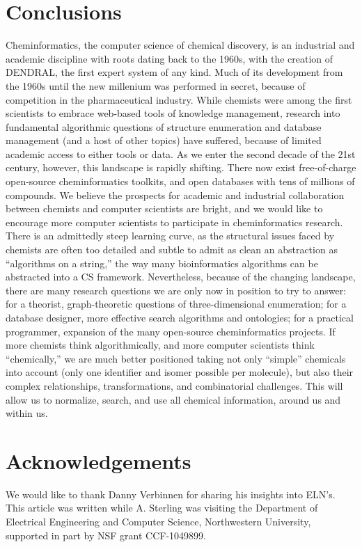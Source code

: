 \documentclass{sig-alternate}
\begin{document}
\section{Conclusions}
\label{sec:conclusions}
Cheminformatics, the computer science of chemical discovery, is an
industrial and academic discipline with roots dating back to the
1960s, with the creation of DENDRAL, the first expert system of any
kind.  Much of its development from the 1960s until the new millenium
was performed in secret, because of competition in the pharmaceutical
industry.  While chemists were among the first scientists to embrace
web-based tools of knowledge management, research into fundamental
algorithmic questions of structure enumeration and database management
(and a host of other topics) have suffered, because of limited
academic access to either tools or data.  As we enter the second
decade of the 21st century, however, this landscape is rapidly
shifting.  There now exist free-of-charge open-source cheminformatics
toolkits, and open databases with tens of millions of compounds.  We
believe the prospects for academic and industrial collaboration
between chemists and computer scientists are bright, and we
would like to encourage more computer scientists to participate in
cheminformatics research.  There is an admittedly steep learning
curve, as the structural issues faced by chemists are often too
detailed and subtle to admit as clean an abstraction as ``algorithms
on a string,'' the way many bioinformatics algorithms can be abstracted into a CS
framework.  Nevertheless, because of the changing landscape, there are
many research questions we are only now in position to try to answer:
for a theorist, graph-theoretic questions of three-dimensional
enumeration; for a database designer, more effective search algorithms
and ontologies; for a practical programmer, expansion of the many
open-source cheminformatics projects.  If more chemists think
algorithmically, and more computer scientists think ``chemically,''
we are much better positioned taking not only ``simple'' chemicals
into account (only one identifier and isomer possible per molecule),
but also their complex relationships, transformations, and
combinatorial challenges. This will allow us to
normalize, search, and use all chemical information, around us and
within us.

\section*{Acknowledgements}
We would like to thank Danny Verbinnen for sharing his insights into
ELN's.  This article was written while A. Sterling was visiting the
Department of Electrical Engineering and Computer Science,
Northwestern University, supported in part by NSF grant CCF-1049899.



\end{document}
